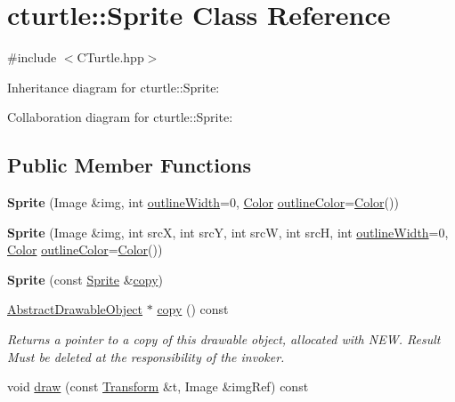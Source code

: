 \hypertarget{classcturtle_1_1Sprite}{}\section{cturtle\+:\+:Sprite Class Reference}
\label{classcturtle_1_1Sprite}


{\ttfamily \#include $<$C\+Turtle.\+hpp$>$}



Inheritance diagram for cturtle\+:\+:Sprite\+:


Collaboration diagram for cturtle\+:\+:Sprite\+:
\subsection*{Public Member Functions}
\begin{DoxyCompactItemize}
\item 
\mbox{\label{classcturtle_1_1Sprite_adca3803189c23c887a3f39de00db4bdd}} 
{\bfseries Sprite} (Image \&img, int \hyperlink{classcturtle_1_1AbstractDrawableObject_aeffaecc245057e9a42e5688671a77f52}{outline\+Width}=0, \hyperlink{classcturtle_1_1Color}{Color} \hyperlink{classcturtle_1_1AbstractDrawableObject_abd04640855e7623bb84b52babd8b32b6}{outline\+Color}=\hyperlink{classcturtle_1_1Color}{Color}())
\item 
\mbox{\label{classcturtle_1_1Sprite_a56cdc4cb92ae5a5108cb34c9c284ebb0}} 
{\bfseries Sprite} (Image \&img, int srcX, int srcY, int srcW, int srcH, int \hyperlink{classcturtle_1_1AbstractDrawableObject_aeffaecc245057e9a42e5688671a77f52}{outline\+Width}=0, \hyperlink{classcturtle_1_1Color}{Color} \hyperlink{classcturtle_1_1AbstractDrawableObject_abd04640855e7623bb84b52babd8b32b6}{outline\+Color}=\hyperlink{classcturtle_1_1Color}{Color}())
\item 
\mbox{\label{classcturtle_1_1Sprite_a818e253f4d3cbb268e753f5ceee12d1d}} 
{\bfseries Sprite} (const \hyperlink{classcturtle_1_1Sprite}{Sprite} \&\hyperlink{classcturtle_1_1Sprite_a96682206c9ba4d31e73526d657fd346b}{copy})
\item 
\mbox{\label{classcturtle_1_1Sprite_a96682206c9ba4d31e73526d657fd346b}} 
\hyperlink{classcturtle_1_1AbstractDrawableObject}{Abstract\+Drawable\+Object} $\ast$ \hyperlink{classcturtle_1_1Sprite_a96682206c9ba4d31e73526d657fd346b}{copy} () const
\begin{DoxyCompactList}\small\item\em Returns a pointer to a copy of this drawable object, allocated with N\+EW. Result Must be deleted at the responsibility of the invoker. \end{DoxyCompactList}\item 
void \hyperlink{classcturtle_1_1Sprite_a7b57808acc51a2610b7d33f542a7f838}{draw} (const \hyperlink{classcturtle_1_1Transform}{Transform} \&t, Image \&img\+Ref) const
\end{DoxyCompactItemize}
